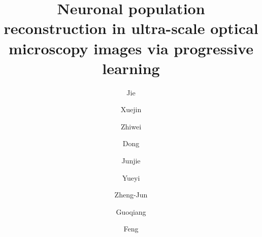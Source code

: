 \documentclass[times,twocolumn,final]{elsarticle}
\begin{document}
	

\begin{frontmatter}

\title{Neuronal population reconstruction in ultra-scale optical microscopy images via progressive learning}                       

\author{Jie }
\author{Xuejin }
\author{Zhiwei }
\author{Dong }
\author{Junjie  }
\author{Yueyi }
\author{Zheng-Jun }
\author{Guoqiang }
\author{Feng }

\address{National Engineering Laboratory for Brain-inspired Intelligence Technology and Application, University of Science and Technology of China, No. 96 Jinzhai Road, Hefei, Anhui, 230026, China} 



\end{frontmatter}
\end{document}
